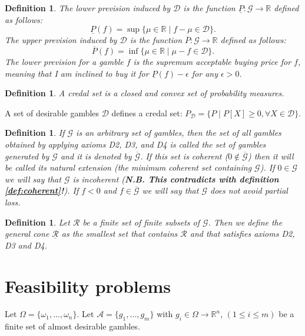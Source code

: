 \documentclass{article}
\theoremstyle{mytheorem}
\newtheorem{definition}[theorem]{Definition}
\newcommand{\func}[1]{\ensuremath{\textsf{#1}}} %
\newcommand{\set}[1]{\ensuremath{\{ #1 \} }} %
\begin{document}
\begin{definition}
The \emph{lower prevision induced by $\mathcal{D}$} is the function $\underline{P}:
\mathcal{G} \rightarrow \mathbb{R}$ defined as follows: 
\[
\underline{P}(f) = \sup \set{\mu \in \mathbb{R} \mid f - \mu \in \mathcal{D}}.
\]
The \emph{upper prevision induced by $\mathcal{D}$} is the function $\overline{P}:
\mathcal{G} \rightarrow \mathbb{R}$ defined as follows:
\[
\overline{P}(f) = \inf \set{\mu \in \mathbb{R} \mid \mu - f \in \mathcal{D}}.
\]
The lower prevision for a gamble $f$ is the supremum acceptable buying price for $f$, meaning that I am inclined to buy it for $\underline{P}(f) - \epsilon$ for any $\epsilon > 0$.
\end{definition}


\begin{definition}
A \emph{credal set} is a closed and convex set of probability measures.
\end{definition}
\noindent
A set of desirable gambles $\mathcal{D}$ defines a credal set: $P_\mathcal{D} = \set{P \mid P[X ] \geq 0, \forall X \in \mathcal{D}}$.

\begin{definition}
If $\mathcal{G}$ is an arbitrary set of gambles, then the set of
all gambles obtained by applying axioms D2, D3, and
D4 is called the \emph{set of gambles generated by $\mathcal{G}$} and it
is denoted by $\overline{\mathcal{G}}$. If this set is coherent ($0 \notin \overline{\mathcal{G}}$) then it will be called its \emph{natural extension} (the minimum coherent set containing $\mathcal{G}$). If $0 \in \mathcal{G}$ we will say that $\mathcal{G}$ is incoherent (\textbf{N.B. This contradicts with definition \ref{def:coherent}!}). If $f < 0$ and $f \in \overline{\mathcal{G}}$ we will say that $\mathcal{G}$ does not avoid partial loss.
\end{definition}

\begin{definition}
Let $\mathcal{R}$ be a finite set of finite subsets of $\mathcal{G}$. Then we define the \emph{general cone} $\underline{\mathcal{R}}$ as the smallest set that contains $\mathcal{R}$ and that satisfies axioms D2, D3 and D4.
\end{definition}

\clearpage
\section{Feasibility problems}
Let $\Omega = \set{\omega_1, \ldots, \omega_n}$.
Let $\mathcal{A} = \set{g_1, \ldots, g_m}$ with $g_i \in \Omega \rightarrow \mathbb{R}^n$,  $(1 \leq i \leq m)$ be a finite set of almost desirable gambles.
\end{document}
